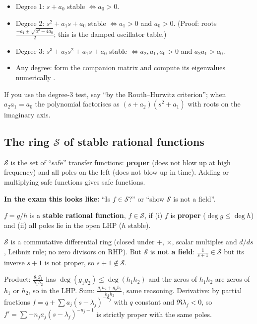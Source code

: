 \begin{thmbox}[title={Useful tests by degree (degree 3 is Routh's extension, \emph{not proved} in the notes)}]
\begin{itemize}
\item Degree 1: $s+a_0$ stable $\iff a_0>0$.
\item Degree 2: $s^2+a_1s+a_0$ stable $\iff a_1>0$ and $a_0>0$. (Proof: roots $\frac{-a_1\pm\sqrt{a_1^2-4a_0}}2$; this is the damped oscillator table.)
\item Degree 3: $s^3+a_2s^2+a_1s+a_0$ stable $\iff a_2,a_1,a_0>0$ and $\boxed{a_2a_1>a_0}$.
\item Any degree: form the companion matrix and compute its eigenvalues numerically .
\end{itemize}
If you use the degree-3 test, say ``by the Routh--Hurwitz criterion''; when $a_2a_1=a_0$ the polynomial factorises as $(s+a_2)(s^2+a_1)$ with roots on the imaginary axis.
\end{thmbox}

\subsection{The ring \texorpdfstring{$\mathcal S$}{S} of stable rational functions \texorpdfstring{}{}}\label{ss:5-2}
\begin{plainbox}
$\mathcal S$ is the set of ``safe'' transfer functions: \textbf{proper} (does not blow up at high frequency) and all poles on the
left (does not blow up in time). Adding or multiplying safe functions gives safe functions.
\par\smallskip\textbf{In the exam this looks like:} ``Is $f\in\mathcal S$?'' or ``show $\mathcal S$ is not a field''.
\end{plainbox}
\begin{defbox}
$f=g/h$ is a \textbf{stable rational function}, $f\in\mathcal S$, if (i) $f$ is \textbf{proper} ($\deg g\le\deg h$) and (ii) all poles lie in the open LHP ($h$ stable).
\end{defbox}
\begin{thmbox}[title={Proposition 0.44}]
$\mathcal S$ is a commutative differential ring (closed under $+$, $\times$, scalar multiples and $d/ds$, Leibniz rule; no zero divisors on RHP). But $\mathcal S$ is \textbf{not a field}:
$\frac1{s+1}\in\mathcal S$ but its inverse $s+1$ is not proper, so $s+1\notin\mathcal S$.
\end{thmbox}
\begin{proofbox}[title={Proof sketch (closure)}]
Product: $\frac{g_1g_2}{h_1h_2}$ has $\deg(g_1g_2)\le\deg(h_1h_2)$ and the zeros of $h_1h_2$ are zeros of $h_1$ or $h_2$, so in the LHP.
Sum: $\frac{g_1h_2+g_2h_1}{h_1h_2}$, same reasoning. Derivative: by partial fractions $f=q+\sum a_j(s-\lambda_j)^{-n_j}$ with $q$ constant and $\Re\lambda_j<0$, so
$f'=\sum -n_ja_j(s-\lambda_j)^{-n_j-1}$ is strictly proper with the same poles.
\end{proofbox}

